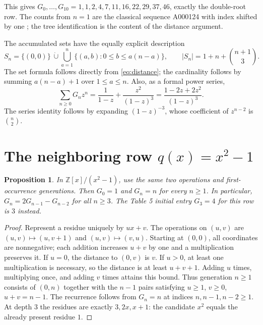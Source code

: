 \documentclass[11pt]{article}
\newtheorem{proposition}[theorem]{Proposition}
\newcommand{\ZZ}{\mathbb Z}
\begin{document}
This gives $G_0,\ldots,G_{10}=1,1,2,4,7,11,16,22,29,37,46$, exactly
the double-root row. The counts from $n=1$ are the classical sequence
A000124 with index shifted by one \cite{oeis}; the tree identification
is the content of the distance argument.

The accumulated sets have the equally explicit description
\[
 S_n=\{(0,0)\}\ \dot\cup\!
 \bigcup_{a=1}^n\{(a,b):0\leq b\leq a(n-a)\},\qquad
 |S_n|=1+n+\binom{n+1}{3}.
\]
The set formula follows directly from \eqref{eq:distance}; the cardinality
follows by summing $a(n-a)+1$ over $1\leq a\leq n$.
Also, as a formal power series,
\[
 \sum_{n\geq0}G_nz^n
 =\frac1{1-z}+\frac{z^2}{(1-z)^3}
 =\frac{1-2z+2z^2}{(1-z)^3}.
\]
The series identity follows by expanding $(1-z)^{-3}$, whose coefficient
of $z^{n-2}$ is $\binom n2$.

\section{The neighboring row \texorpdfstring{$q(x)=x^2-1$}{q(x)=x2-1}}
\begin{proposition}\label{prop:sibling}
In $\ZZ[x]/(x^2-1)$, use the same two operations and first-occurrence
generations. Then $G_0=1$ and $G_n=n$ for every $n\geq1$.
In particular, $G_n=2G_{n-1}-G_{n-2}$ for all $n\geq3$.
The Table 5 initial entry $G_3=4$ for this row is $3$ instead.
\end{proposition}
\begin{proof}
Represent a residue uniquely by $ux+v$. The operations on $(u,v)$ are
$(u,v)\mapsto(u,v+1)$ and $(u,v)\mapsto(v,u)$.
Starting at $(0,0)$, all coordinates are nonnegative; each addition
increases $u+v$ by one and a multiplication preserves it.
If $u=0$, the distance to $(0,v)$ is $v$. If $u>0$, at least one
multiplication is necessary, so the distance is at least $u+v+1$.
Adding $u$ times, multiplying once, and adding $v$ times attains this
bound. Thus generation $n\geq1$ consists of $(0,n)$ together with
the $n-1$ pairs satisfying $u\geq1$, $v\geq0$, $u+v=n-1$.
The recurrence follows from $G_n=n$ at indices $n,n-1,n-2\geq1$.
At depth $3$ the residues are exactly $3,2x,x+1$: the candidate $x^2$
equals the already present residue $1$.
\end{proof}
\end{document}
